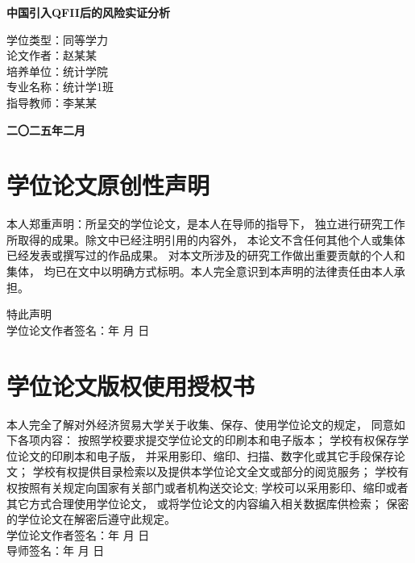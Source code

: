 \documentclass[UTF8,a4paper]{ctexart}
\begin{document}
\thispagestyle{empty}
\begin{center}
    \vspace*{2cm}
    {\heiti\bfseries{} 中国引入QFII后的风险实证分析}
    
    \vspace{3cm}
    {\songti\bfseries{}
    \begin{minipage}{0.4\textwidth}
    学位类型：同等学力 \\
    论文作者：赵某某 \\
    培养单位：统计学院 \\
    专业名称：统计学1班 \\
    指导教师：李某某\\
    \end{minipage}
    }
    
    \vfill
    {\heiti\bfseries{} 二〇二五年二月}
\end{center}

\newpage
\thispagestyle{empty}
\section*{学位论文原创性声明}
\begin{spacing}{1.5}
{\songti{}
本人郑重声明：所呈交的学位论文，是本人在导师的指导下，
独立进行研究工作所取得的成果。除文中已经注明引用的内容外，
本论文不含任何其他个人或集体已经发表或撰写过的作品成果。
对本文所涉及的研究工作做出重要贡献的个人和集体，
均已在文中以明确方式标明。本人完全意识到本声明的法律责任由本人承担。

特此声明\\[2cm]

学位论文作者签名：\quad \quad \quad \quad 年 \quad 月 \quad 日}
\end{spacing}

\newpage
\thispagestyle{empty}
\section*{学位论文版权使用授权书}
\begin{spacing}{1.5}
{\songti{}
本人完全了解对外经济贸易大学关于收集、保存、使用学位论文的规定，
同意如下各项内容：
按照学校要求提交学位论文的印刷本和电子版本；
学校有权保存学位论文的印刷本和电子版，
并采用影印、缩印、扫描、数字化或其它手段保存论文；
学校有权提供目录检索以及提供本学位论文全文或部分的阅览服务；
学校有权按照有关规定向国家有关部门或者机构送交论文; 
学校可以采用影印、缩印或者其它方式合理使用学位论文，
或将学位论文的内容编入相关数据库供检索；
保密的学位论文在解密后遵守此规定。\\[2cm]

学位论文作者签名：\quad \quad \quad 年 \quad 月 \quad 日\\

导师签名：\quad \quad \quad \quad \quad \quad \quad 年 \quad 月 \quad 日}
\end{spacing}
\end{document}

